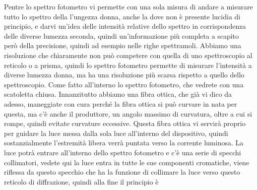 Pentre lo spettro fotometro vi permette con una sola misura di andare a misurare tutto lo spettro della l'ungezza donna, anche la dove non è presente lucidia di principio, e darvi un'idea delle intensità relative dello spettro in corrispondenza delle diverse lumezza seconda, quindi un'informazione più completa a scapito però della precisione, quindi ad esempio nelle righe spettramoli. Abbiamo una risoluzione che chiaramente non può competere con quella di uno spettroscopio al reticolo o a prisma, quindi lo spettro fotometro permette di misurare l'intensità a diverse lumezza donna, ma ha una risoluzione più scarsa rispetto a quello dello spettroscopio. Come fatto all'interno lo spettro fotometro, che vedrete con una scatoletta chiusa. Innanzitutto abbiamo una fibra ottica, che già vi dico da adesso, maneggiate con cura perché la fibra ottica si può curvare in nata per questa, ma c'è anche il produttore, un angolo massimo di curvatura, oltre a cui si rompe, quindi evitate curvature eccessive. Questa fibra ottica vi servirà proprio per guidare la luce messa dalla sola luce all'interno del dispositivo, quindi sostanzialmente l'estremità libera verrà puntata verso la corrente luminosa. La luce potrà entrare all'interno dello spettro fotometro e c'è una serie di specchi collimatori, vedete qui la luce entra in tutte le sue componenti cromatiche, viene riflessa da questo specchio che ha la funzione di collimare la luce verso questo reticolo di diffrazione, quindi alla fine il principio è 

